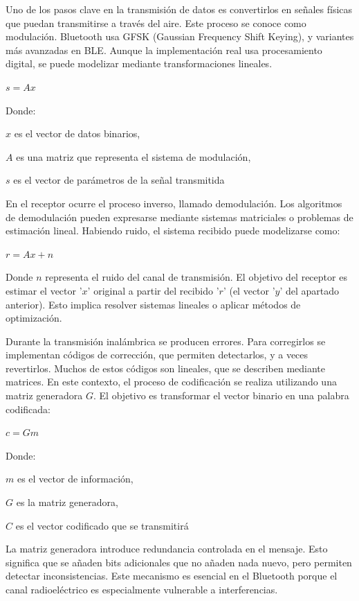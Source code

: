 \documentclass[letterpaper,12pt]{article}
\begin{document}
Uno de los pasos clave en la transmisión de datos es convertirlos en señales físicas que puedan
transmitirse a través del aire. Este proceso se conoce como modulación. Bluetooth usa GFSK
(Gaussian Frequency Shift Keying), y variantes más avanzadas en BLE. Aunque la
implementación real usa procesamiento digital, se puede modelizar mediante transformaciones
lineales.

                                             \centerline{$s = Ax$}

Donde:

$x$ es el vector de datos binarios,

$A$ es una matriz que representa el sistema de modulación,

$s$ es el vector de parámetros de la señal transmitida

En el receptor ocurre el proceso inverso, llamado demodulación. Los algoritmos de demodulación
pueden expresarse mediante sistemas matriciales o problemas de estimación lineal. Habiendo
ruido, el sistema recibido puede modelizarse como:

\centerline{$r=Ax+n$}

Donde $n$ representa el ruido del canal de transmisión. El objetivo del receptor es estimar el vector
'$x$' original a partir del recibido '$r$' (el vector '$y$' del apartado anterior). Esto implica resolver
sistemas lineales o aplicar métodos de optimización.





\newpage
{}
Durante la transmisión inalámbrica se producen errores. Para corregirlos se implementan códigos
de corrección, que permiten detectarlos, y a veces revertirlos. Muchos de estos códigos son lineales,
que se describen mediante matrices. En este contexto, el proceso de codificación se realiza
utilizando una matriz generadora $G$. El objetivo es transformar el vector binario en una palabra
codificada:

\centerline{$c=Gm$}

Donde:

$m$ es el vector de información,

$G$ es la matriz generadora,

$C$ es el vector codificado que se transmitirá

La matriz generadora introduce redundancia controlada en el mensaje. Esto significa que se añaden
bits adicionales que no añaden nada nuevo, pero permiten detectar inconsistencias. Este
mecanismo es esencial en el Bluetooth porque el canal radioeléctrico es especialmente vulnerable
a interferencias.
\end{document}
